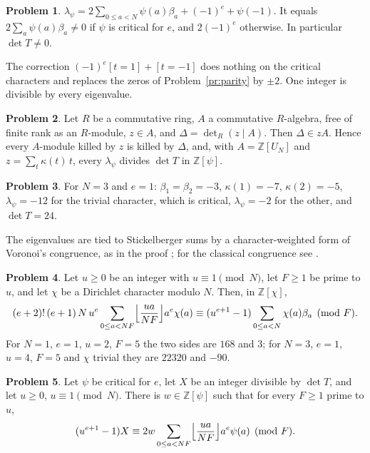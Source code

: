 \documentclass[reqno]{amsart}
\theoremstyle{definition}
\newtheorem{problem}{Problem}[section]
\theoremstyle{plain}
\newcommand{\Z}{\mathbb{Z}}
\begin{document}
\begin{problem}\label{pr:eigen}
\(\lambda_\psi=2\sum_{0\le a<N}\psi(a)\beta_a+(-1)^e+\psi(-1)\).  It equals \(2\sum_a\psi(a)\beta_a\ne0\) if \(\psi\) is critical for \(e\), and \(2(-1)^e\) otherwise.  In particular \(\det T\ne0\).
\end{problem}

The correction \((-1)^e[t=1]+[t=-1]\) does nothing on the critical characters and replaces the zeros of Problem~\ref{pr:parity} by \(\pm2\).  One integer is divisible by every eigenvalue.

\begin{problem}\label{pr:adjugate}
Let \(R\) be a commutative ring, \(A\) a commutative \(R\)-algebra, free of finite rank as an \(R\)-module, \(z\in A\), and \(\Delta=\det_R(z\mid A)\).  Then \(\Delta\in zA\).  Hence every \(A\)-module killed by \(z\) is killed by \(\Delta\), and, with \(A=\Z[U_N]\) and \(z=\sum_t\kappa(t)\,t\), every \(\lambda_\psi\) divides \(\det T\) in \(\Z[\psi]\).
\end{problem}

\begin{problem}\label{pr:simplest}
For \(N=3\) and \(e=1\): \(\beta_1=\beta_2=-3\), \(\kappa(1)=-7\), \(\kappa(2)=-5\), \(\lambda_\psi=-12\) for the trivial character, which is critical, \(\lambda_\psi=-2\) for the other, and \(\det T=24\).
\end{problem}

The eigenvalues are tied to Stickelberger sums by a character-weighted form of Voronoi's congruence, as in the proof \cite{GL}; for the classical congruence see \cite[Ch.~15, \S2]{IR}.

\begin{problem}\label{pr:zcong}
Let \(u\ge0\) be an integer with \(u\equiv1\pmod N\), let \(F\ge1\) be prime to \(u\), and let \(\chi\) be a Dirichlet character modulo \(N\).  Then, in \(\Z[\chi]\),
\[
 (e+2)!\,(e+1)\,N\,u^e\sum_{0\le a<NF}\Bigl\lfloor\frac{ua}{NF}\Bigr\rfloor a^e\chi(a)\equiv(u^{e+1}-1)\sum_{0\le a<N}\chi(a)\beta_a\pmod F.
\]
For \(N=1\), \(e=1\), \(u=2\), \(F=5\) the two sides are \(168\) and \(3\); for \(N=3\), \(e=1\), \(u=4\), \(F=5\) and \(\chi\) trivial they are \(22320\) and \(-90\).
\end{problem}

\begin{problem}\label{pr:witness}
Let \(\psi\) be critical for \(e\), let \(X\) be an integer divisible by \(\det T\), and let \(u\ge0\), \(u\equiv1\pmod N\).  There is \(w\in\Z[\psi]\) such that for every \(F\ge1\) prime to \(u\),
\[
 (u^{e+1}-1)X\equiv2w\sum_{0\le a<NF}\Bigl\lfloor\frac{ua}{NF}\Bigr\rfloor a^e\psi(a)\pmod F.
\]
\end{problem}
\end{document}

